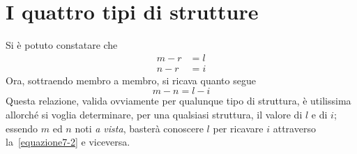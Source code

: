 \section{I quattro tipi di strutture}
Si è potuto constatare che
\begin{align*}
m-r &= l \\
n-r &= i
\end{align*}
Ora, sottraendo membro a membro, si ricava quanto segue
\begin{equation} \label{equazione7-2}
\boxed{m-n=l-i}
\tag{7.2}
\end{equation}
Questa relazione, valida ovviamente per qualunque tipo di struttura, è utilissima allorché si voglia determinare, per una qualsiasi struttura, il valore di $l$ e di $i$; essendo $m$ ed $n$ noti \emph{a vista}, basterà conoscere $l$ per ricavare $i$ attraverso la~\eqref{equazione7-2} e viceversa. 

